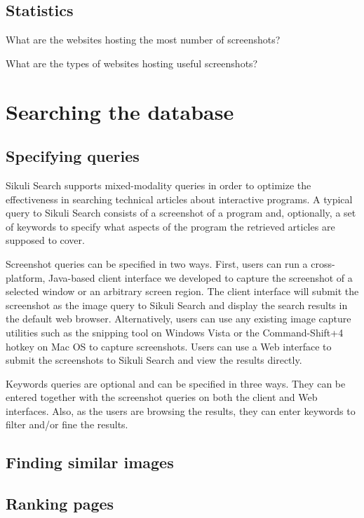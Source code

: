 \documentclass{www2010-submission}
\begin{document}
\subsection{Statistics}

What are the websites hosting the most number of screenshots?

What are the types of websites hosting useful screenshots?


\section{Searching the database}

\subsection{Specifying queries}

Sikuli Search supports mixed-modality queries in order to optimize
the effectiveness in searching technical articles about
interactive programs. A typical query to Sikuli Search consists of
a screenshot of a program and, optionally, a set of keywords to
specify what aspects of the program the retrieved articles are
supposed to cover.

Screenshot queries can be specified in two ways. First, users can
run a cross-platform, Java-based client interface we developed to
capture the screenshot of a selected window or an arbitrary screen
region. The client interface will submit the screenshot as the
image query to Sikuli Search and display the search results in the
default web browser. Alternatively, users can use any existing
image capture utilities such as the snipping tool on Windows Vista
or the Command-Shift+4 hotkey on Mac OS to capture screenshots.
Users can use a Web interface to submit the screenshots to Sikuli
Search and view the results directly.

Keywords queries are optional and can be specified in three ways.
They can be entered together with the screenshot queries on both
the client and Web interfaces. Also, as the users are browsing the
results, they can enter keywords to filter and/or fine the
results.



\subsection{Finding similar images}


\subsection{Ranking pages}
\end{document}
